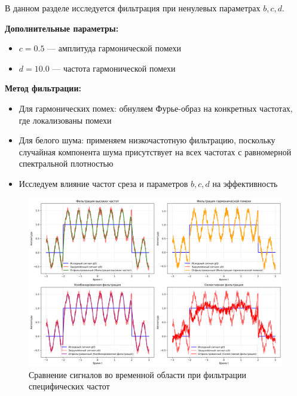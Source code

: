В данном разделе исследуется фильтрация при ненулевых параметрах $b, c, d$.

\textbf{Дополнительные параметры:}
\begin{itemize}
    \item $c = 0.5$ — амплитуда гармонической помехи
    \item $d = 10.0$ — частота гармонической помехи
\end{itemize}

\textbf{Метод фильтрации:}
\begin{itemize}
    \item Для гармонических помех: обнуляем Фурье-образ на конкретных частотах, где локализованы помехи
    \item Для белого шума: применяем низкочастотную фильтрацию, поскольку случайная компонента шума присутствует на всех частотах с равномерной спектральной плотностью
    \item Исследуем влияние частот среза и параметров $b, c, d$ на эффективность
\end{itemize}

\begin{figure}[H]
\centering
\includegraphics[width=\textwidth]{images/task1/specific_freq_filter_time_domain.png}
\caption{Сравнение сигналов во временной области при фильтрации специфических частот}
\end{figure}

